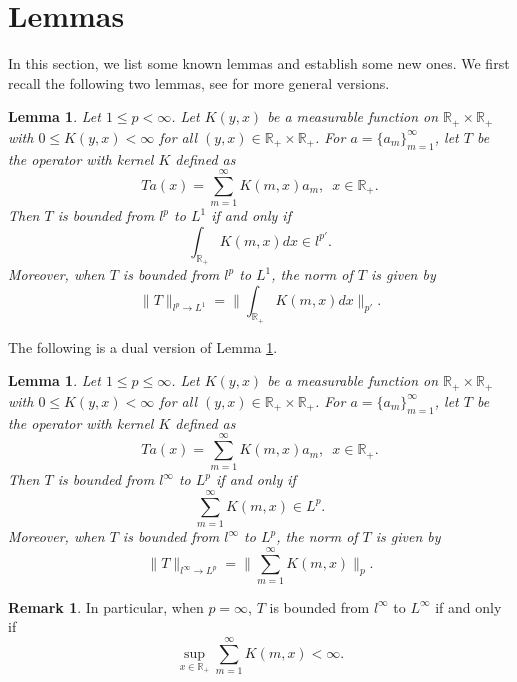 \documentclass[10pt]{amsart}
\newtheorem{lemma}[theorem]{Lemma}
\theoremstyle{definition}    %
\newtheorem{remark}[theorem]{Remark}
\numberwithin{equation}{section}
\begin{document}
\section{{\bf Lemmas}}
In this section, we list some known lemmas and establish some new ones.  We first recall the following two lemmas, see \cite[Problem 5.5]{Tao} for more general versions. 
\begin{lemma}\label{ll-1}
Let $1\leq p <\infty$. Let $K(y,x)$ be a measurable function on $\mathbb{R}_{+}\times \mathbb{R}_{+}$ with $0 \leq K(y,x)<\infty$ for all $(y,x)\in \mathbb{R}_{+}\times \mathbb{R}_{+}$. For $a=\{a_m\}_{m=1}^{\infty}$, let $T$ be the operator with kernel $K$ defined as
$$Ta(x)=\sum_{m=1}^{\infty}K(m,x)a_m,\,\,\, x\in \mathbb{R}_{+}.$$
Then $T$ is bounded from $l^{p}$ to $L^{1}$ if and only if 
$$\int_{\mathbb{R}_{+}}K(m,x)dx\in l^{p'}.$$
Moreover, when $T$ is bounded from $l^{p}$ to $L^{1}$, the norm of $T$ is given by
$$\|T\|_{l^{p}\rightarrow L^1}=\|\int_{\mathbb{R}_{+}}K(m,x)dx\|_{p'}.$$
\end{lemma}
The following is a dual version of Lemma \ref{ll-1}. 

\begin{lemma}\label{ll-2}
Let $1\leq p\leq\infty$. Let $K(y,x)$ be a measurable function on $\mathbb{R}_{+}\times \mathbb{R}_{+}$ with $0 \leq K(y,x)<\infty$ for all $(y,x)\in \mathbb{R}_{+}\times \mathbb{R}_{+}$. For $a=\{a_m\}_{m=1}^{\infty}$, let $T$ be the operator with kernel $K$ defined as
$$Ta(x)=\sum_{m=1}^{\infty}K(m,x)a_m,\,\,\, x\in \mathbb{R}_{+}.$$
Then $T$ is bounded from $l^{\infty}$ to $L^{p}$ if and only if 
$$\sum_{m=1}^{\infty}K(m,x)\in L^{p}.$$
Moreover, when  $T$ is bounded from $l^{\infty}$ to $L^{p}$, the norm of $T$ is given by
$$\|T\|_{l^{\infty}\rightarrow L^{p}}=\|\sum_{m=1}^{\infty}K(m,x)\|_{p}.$$
\end{lemma}
\begin{remark}In particular, when $p=\infty$, $T$ is bounded from $l^{\infty}$ to $L^{\infty}$ if and only if 
$$\sup_{x\in \mathbb{R}_{+}}\sum_{m=1}^{\infty}K(m,x)<\infty.$$
\end{remark}
\end{document}
